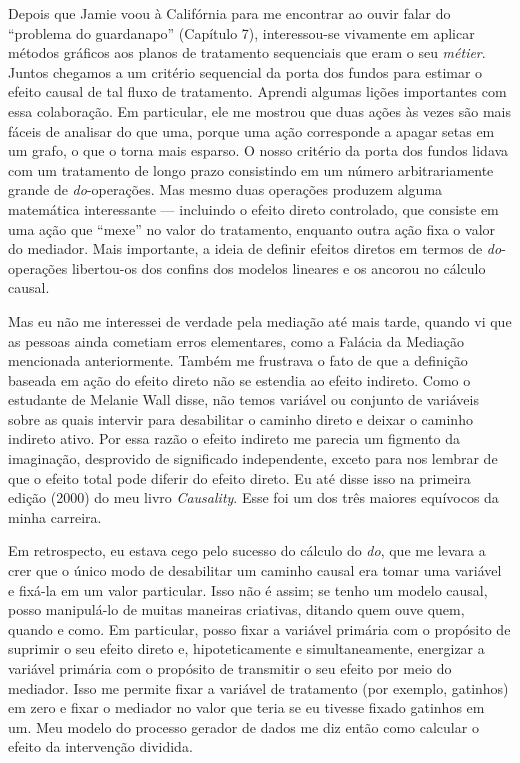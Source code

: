 \documentclass[11pt,a5paper,twoside]{book}
\begin{document}
Depois que Jamie voou à Califórnia para me encontrar ao ouvir falar do “problema do guardanapo” (Capítulo 7), interessou-se vivamente em aplicar métodos gráficos aos planos de tratamento sequenciais que eram o seu \textit{métier}. Juntos chegamos a um critério sequencial da porta dos fundos para estimar o efeito causal de tal fluxo de tratamento. Aprendi algumas lições importantes com essa colaboração. Em particular, ele me mostrou que duas ações às vezes são mais fáceis de analisar do que uma, porque uma ação corresponde a apagar setas em um grafo, o que o torna mais esparso. O nosso critério da porta dos fundos lidava com um tratamento de longo prazo consistindo em um número arbitrariamente grande de \textit{do}-operações. Mas mesmo duas operações produzem alguma matemática interessante — incluindo o efeito direto controlado, que consiste em uma ação que “mexe” no valor do tratamento, enquanto outra ação fixa o valor do mediador. Mais importante, a ideia de definir efeitos diretos em termos de \textit{do}-operações libertou-os dos confins dos modelos lineares e os ancorou no cálculo causal.

Mas eu não me interessei de verdade pela mediação até mais tarde, quando vi que as pessoas ainda cometiam erros elementares, como a Falácia da Mediação mencionada anteriormente. Também me frustrava o fato de que a definição baseada em ação do efeito direto não se estendia ao efeito indireto. Como o estudante de Melanie Wall disse, não temos variável ou conjunto de variáveis sobre as quais intervir para desabilitar o caminho direto e deixar o caminho indireto ativo. Por essa razão o efeito indireto me parecia um figmento da imaginação, desprovido de significado independente, exceto para nos lembrar de que o efeito total pode diferir do efeito direto. Eu até disse isso na primeira edição (2000) do meu livro \textit{Causality}. Esse foi um dos três maiores equívocos da minha carreira.

Em retrospecto, eu estava cego pelo sucesso do cálculo do \textit{do}, que me levara a crer que o único modo de desabilitar um caminho causal era tomar uma variável e fixá-la em um valor particular. Isso não é assim; se tenho um modelo causal, posso manipulá-lo de muitas maneiras criativas, ditando quem ouve quem, quando e como. Em particular, posso fixar a variável primária com o propósito de suprimir o seu efeito direto e, hipoteticamente e simultaneamente, energizar a variável primária com o propósito de transmitir o seu efeito por meio do mediador. Isso me permite fixar a variável de tratamento (por exemplo, gatinhos) em zero e fixar o mediador no valor que teria se eu tivesse fixado gatinhos em um. Meu modelo do processo gerador de dados me diz então como calcular o efeito da intervenção dividida.
\end{document}
